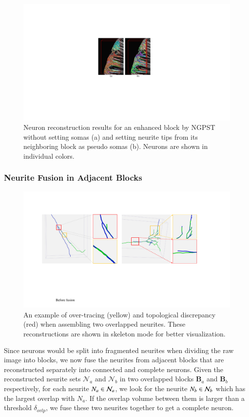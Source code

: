 \begin{figure}[t]
	\centering
	\includegraphics[width=0.8\columnwidth]{./Illustrations/ngpst_pseudosoma.pdf}
	\caption{Neuron reconstruction results for an enhanced block by NGPST without setting somas (a) and setting neurite tips from its neighboring block as pseudo somas (b). Neurons are shown in individual colors. }
	\label{fig:ngpst_pseudosoma}
\end{figure}



\subsubsection{Neurite Fusion in Adjacent Blocks}
\label{sec:fusion}


\begin{figure}[b]
	\centering
	\includegraphics[width=0.9\columnwidth]{./Illustrations/fusion_errors.pdf}
	\caption{An example of over-tracing (yellow) and topological discrepancy (red) when assembling two overlapped neurites. These reconstructions are shown in skeleton mode for better visualization.}
	\label{fig:overlap_discrepancy}
\end{figure}
Since neurons would be split into fragmented neurites when dividing the raw image into blocks, we now fuse the neurites from adjacent blocks that are reconstructed separately into connected and complete neurons.
Given the reconstructed neurite sets $\mathcal{N}_a$ and $\mathcal{N}_b$ in two overlapped blocks $\mathbf{B}_a$ and $\mathbf{B}_b$ respectively, for each neurite ${N}_{a}\in \mathcal{N}_{a}$, we look for the neurite ${N}_{b}\in \mathcal{N}_{b}$ which has the largest overlap with ${N}_{a}$. 
If the overlap volume between them is larger than a threshold $\delta_{ovlp}$, we fuse these two neurites together to get a complete neuron.

